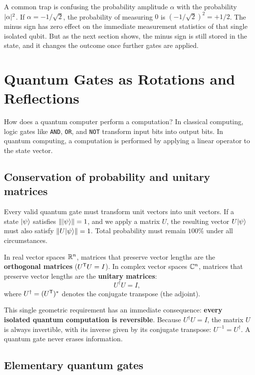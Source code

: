 \begin{trapbox}
A common trap is confusing the probability amplitude $\alpha$ with the probability
$\lvert\alpha\rvert^2$. If $\alpha = -1/\sqrt{2}$, the probability of measuring $0$ is
$(-1/\sqrt{2})^2 = +1/2$. The minus sign has zero effect on the immediate measurement
statistics of that single isolated qubit. But as the next section shows,
the minus sign is still stored in the state, and it changes the outcome once
further gates are applied.
\end{trapbox}

\section{Quantum Gates as Rotations and Reflections}
\label{ch42:quantum-gates}

How does a quantum computer perform a computation? In classical computing, logic
gates like \texttt{AND}, \texttt{OR}, and \texttt{NOT} transform input bits into output
bits. In quantum computing, a computation is performed by applying a linear operator
to the state vector.

\subsection{Conservation of probability and unitary matrices}

Every valid quantum gate must transform unit vectors into unit vectors. If a state
$\lvert \psi \rangle$ satisfies $\lVert \lvert \psi \rangle \rVert = 1$, and we apply a matrix $U$, the resulting
vector $U\lvert \psi \rangle$ must also satisfy $\lVert U\lvert \psi \rangle \rVert = 1$. Total probability
must remain $100\%$ under all circumstances.

In real vector spaces $\mathbb{R}^n$, matrices that preserve vector lengths are the
\textbf{orthogonal matrices} ($U^{\mathsf{T}} U = I$). In complex vector spaces $\mathbb{C}^n$, matrices
that preserve vector lengths are the \textbf{unitary matrices}:
\[
  U^\dagger U = I,
\]
where $U^\dagger = (U^{\mathsf{T}})^*$ denotes the conjugate transpose (the adjoint).

This single geometric requirement has an immediate consequence: \textbf{every
isolated quantum computation is reversible}. Because $U^\dagger U = I$, the matrix
$U$ is always invertible, with its inverse given by its conjugate transpose:
$U^{-1} = U^\dagger$. A quantum gate never erases information.

\subsection{Elementary quantum gates}


